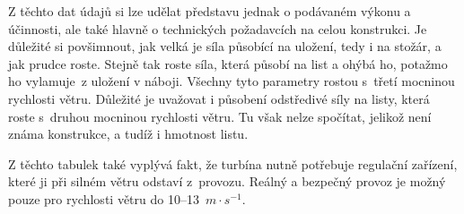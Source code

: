 	Z těchto dat údajů si lze udělat představu jednak o podávaném výkonu a účinnosti, ale také hlavně o technických požadavcích na celou konstrukci. Je důležité si povšimnout, jak velká je síla působící na uložení, tedy i na stožár, a jak prudce roste. Stejně tak roste síla, která působí na list a ohýbá ho, potažmo ho vylamuje~z uložení v náboji. Všechny tyto parametry rostou s~třetí mocninou rychlosti větru. Důležité je uvažovat i působení odstředivé síly na listy, která roste  s~druhou mocninou rychlosti větru. Tu však nelze spočítat, jelikož není známa konstrukce, a tudíž i hmotnost listu.
	
	Z těchto tabulek také vyplývá fakt, že turbína nutně potřebuje regulační zařízení, které ji při silném větru odstaví z~provozu. Reálný a bezpečný provoz je možný pouze pro rychlosti větru do 10–13~$m\cdot s^{-1}$.
	